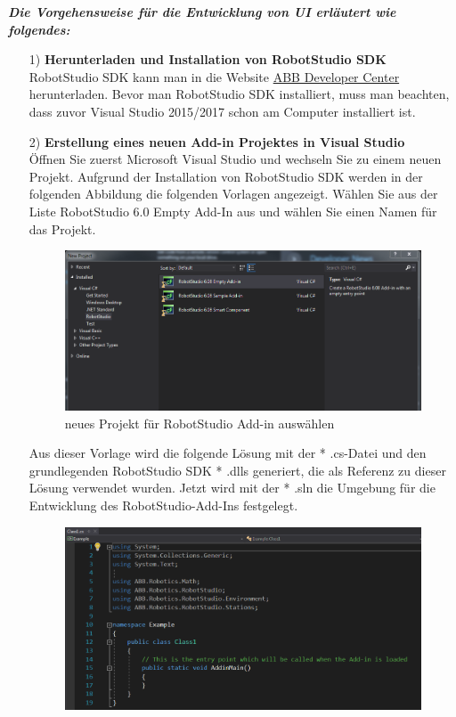 \documentclass[14pt,a4paper,titlepage]{article}
\begin{document}
			\bigbreak
			
			\textbf{\emph{Die Vorgehensweise für die Entwicklung von UI erläutert wie folgendes:}}
			\\
			\begin{itemize}
				\item[1)]
				\textbf{Herunterladen und Installation von RobotStudio SDK} 
				\\
				RobotStudio SDK kann man in die Website \href{http://developercenter.robotstudio.com/downloads_robotstudio}{ABB Developer Center} herunterladen. Bevor man RobotStudio SDK installiert, muss man beachten, dass zuvor Visual Studio 2015/2017 schon am Computer installiert ist. 
				
				\item[2)] 
				\textbf{Erstellung eines neuen Add-in Projektes in Visual Studio}
				\\
				Öffnen Sie zuerst Microsoft Visual Studio und wechseln Sie zu einem neuen Projekt. Aufgrund der Installation von RobotStudio SDK werden in der folgenden Abbildung die folgenden Vorlagen angezeigt.
				Wählen Sie aus der Liste RobotStudio 6.0 Empty Add-In aus und wählen Sie einen Namen für das Projekt.
					\begin{figure}[h!]
					\centering
					\includegraphics[width=0.8\linewidth]{addin.png}
					\caption{neues Projekt für RobotStudio Add-in auswählen}
					\end{figure}
				\bigbreak
				Aus dieser Vorlage wird die folgende Lösung mit der * .cs-Datei und den grundlegenden RobotStudio SDK * .dlls generiert, die als Referenz zu dieser Lösung verwendet wurden. Jetzt wird mit der * .sln die Umgebung für die Entwicklung des RobotStudio-Add-Ins festgelegt.
					\begin{figure}[h!]
					\centering
					\includegraphics[width=0.8\linewidth]{cs.png}

\end{figure}
\end{itemize}
\end{document}
